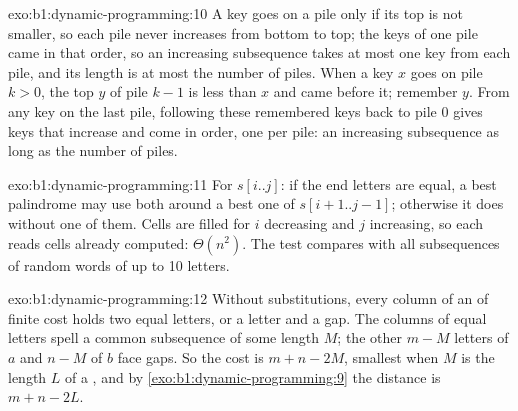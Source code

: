 \begin{solution}{exo:b1:dynamic-programming:10}
A key goes on a pile only if its top is not smaller, so each pile never increases from bottom to top; the keys of one pile came
in that order, so an increasing subsequence takes at most one key from each pile, and its length is at most the number
of piles. When a key $x$ goes on pile $k > 0$, the top $y$ of pile $k - 1$ is less than $x$ and came before it; remember
$y$. From any key on the last pile, following these remembered keys back to pile 0 gives keys that increase and come in
order, one per pile: an increasing subsequence as long as the number of piles.
\end{solution}

\begin{solution}{exo:b1:dynamic-programming:11}
For $s[i..j]$: if the end letters are equal, a best palindrome may use both around a best one of $s[i + 1..j - 1]$;
otherwise it does without one of them. Cells are filled for $i$ decreasing and $j$ increasing, so each reads cells
already computed: $\Theta(n^2)$. The test compares with all subsequences of random words of up to 10 letters.
\end{solution}

\begin{solution}{exo:b1:dynamic-programming:12}
Without substitutions, every column of an  of finite cost holds two equal letters, or a letter and a gap. The
columns of equal letters spell a common subsequence of some length $M$; the other $m - M$ letters of $a$ and $n - M$
of $b$ face gaps. So the cost is $m + n - 2M$, smallest when $M$ is the length $L$ of a , and
by \cref{exo:b1:dynamic-programming:9} the distance is $m + n - 2L$.
\end{solution}

